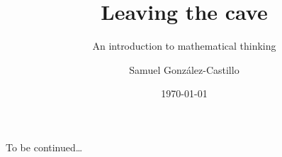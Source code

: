 \title{Leaving the cave}
\subtitle{An introduction to mathematical thinking}
\author{Samuel González-Castillo}
\date{\today}

\usepackage{ccicons}


\dedication{To truth, reason, purity and perfection.}

\newcommand\versiondate{\the\year{}/\the\month{}/\the\day{}}
\release[\versiondate]{1}





\maketitle


\mainmatter


\newpage
\vspace*{\fill}
\centerline{To be continued\ldots}
\vspace*{\fill}

\nocite{*}




